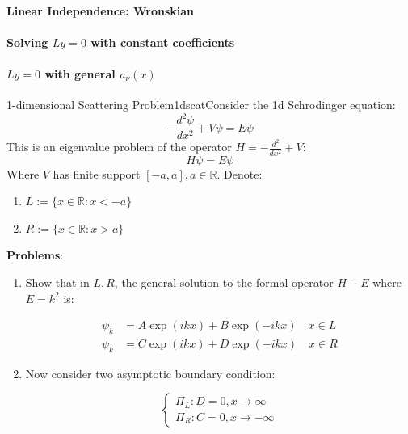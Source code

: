 \paragraph{Linear Independence: Wronskian}

\paragraph{Solving $Ly=0$ with constant coefficients}

\paragraph{$Ly=0$ with general $a_\nu(x)$}

\begin{mystexercise}{1-dimensional Scattering Problem}{1dscat}\label{1dscat}Consider the 1d Schrodinger equation:
\begin{equation}
-\frac{d^2\psi}{dx^2}+V\psi = E\psi
\end{equation}
This is an eigenvalue problem of the operator $H= -\frac{d^2}{dx^2}+V$:
\begin{equation}
H\psi = E\psi
\end{equation}
Where $V$ has finite support $[ -a, a], a\in \mathbb{R}$. Denote:

\begin{enumerate}
\item $L:=\{x\in \mathbb{R}:x< -a\}$
\item $R:=\{x\in \mathbb{R}:x>a\}$
\end{enumerate}

\textbf{Problems}:

\begin{enumerate}
\item Show that in $L,R$, the general solution to the formal operator $H -E$ where $E=k^2$ is:

\begin{equation}
\begin{aligned}
\psi_k &=A\exp(ikx)+B\exp(-ikx) \quad x\in L  \\
\psi_k &=C\exp(ikx)+D\exp(-ikx) \quad x\in R
\end{aligned}
\end{equation}


\item Now consider two asymptotic boundary condition:

\begin{equation}
\begin{cases}
\Pi_L: D=0, x\to \infty \\
\Pi_R: C=0, x\to -\infty
\end{cases}
\end{equation}



\end{enumerate}
\end{mystexercise}
